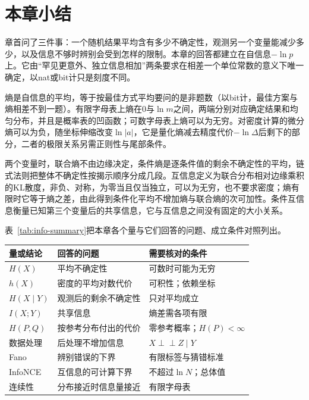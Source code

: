 \section{本章小结}
\label{sec:info-summary}

章首问了三件事：一个随机结果平均含有多少不确定性，观测另一个变量能减少多少，以及信息不够时辨别会受到怎样的限制。本章的回答都建立在自信息$-\ln p$上。它由“罕见更意外、独立信息相加”两条要求在相差一个单位常数的意义下唯一确定，以nat或bit计只是刻度不同。

熵是自信息的平均，等于按最佳方式平均要问的是非题数（以bit计，最佳方案与熵相差不到一题）。有限字母表上熵在$0$与$\ln m$之间，两端分别对应确定结果和均匀分布，并且是概率表的凹函数；可数字母表上熵可以为无穷。对密度计算的微分熵可以为负，随坐标伸缩改变$\ln\lvert a\rvert$，它是量化熵减去精度代价$-\ln\Delta$后剩下的部分，二者的极限关系另需正则性与尾部条件。

两个变量时，联合熵不由边缘决定，条件熵是逐条件值的剩余不确定性的平均，链式法则把整体不确定性按揭示顺序分成几段。互信息定义为联合分布相对边缘乘积的KL散度，非负、对称，为零当且仅当独立，可以为无穷，也不要求密度；熵有限时它等于熵之差，由此得到条件化平均不增加熵与联合熵的次可加性。条件互信息衡量已知第三个变量后的共享信息，它与互信息之间没有固定的大小关系。

表~\ref{tab:info-summary}把本章各个量与它们回答的问题、成立条件对照列出。

\begin{BookInlineTable}
  \centering
  \caption{本章的信息量与主要条件}
  \label{tab:info-summary}
  \begin{tabular}{@{}lll@{}}
    \toprule
    量或结论 & 回答的问题 & 需要核对的条件\\
    \midrule
    $H(X)$ & 平均不确定性 & 可数时可能为无穷\\
    $h(X)$ & 密度的平均对数代价 & 可积性；依赖坐标\\
    $H(X\mid Y)$ & 观测后的剩余不确定性 & 只对平均成立\\
    $I(X;Y)$ & 共享信息 & 熵差需各项有限\\
    $H(P,Q)$ & 按参考分布付出的代价 & 零参考概率；$H(P)<\infty$\\
    数据处理 & 后处理不增加信息 & $X\perp\!\!\!\perp Z\mid Y$\\
    Fano & 辨别错误的下界 & 有限标签与猜错标准\\
    InfoNCE & 互信息的可计算下界 & 不超过$\ln N$；总体值\\
    连续性 & 分布接近时信息量接近 & 有限字母表\\
    \bottomrule
  \end{tabular}
\end{BookInlineTable}

